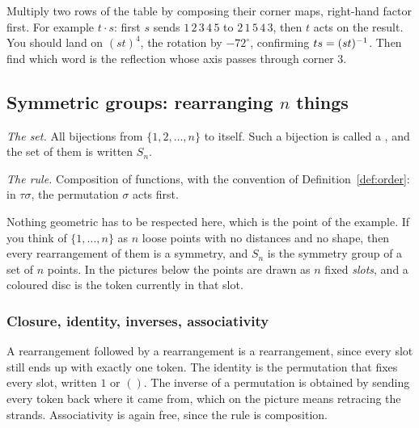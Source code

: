 

\begin{tryit}
Multiply two rows of the table by composing their corner maps, right-hand factor first. For example
$t\cdot s$: first $s$ sends $1\,2\,3\,4\,5$ to $2\,1\,5\,4\,3$, then $t$ acts on the result. You
should land on $(st)^4$, the rotation by $-72^\circ$, confirming $ts=(st)^{-1}$. Then find which word
is the reflection whose axis passes through corner $3$.
\end{tryit}

\subsection{Symmetric groups: rearranging $n$ things}\label{sec:symmetric}

\emph{The set.} All bijections from $\{1,2,\dots,n\}$ to itself. Such a bijection is called a
, and the set of them is written $S_n$.

\emph{The rule.} Composition of functions, with the convention of Definition~\ref{def:order}: in
$\tau\sigma$, the permutation $\sigma$ acts first.

Nothing geometric has to be respected here, which is the point of the example. If you think of
$\{1,\dots,n\}$ as $n$ loose points with no distances and no shape, then every rearrangement of them
is a symmetry, and $S_n$ is the symmetry group of a set of $n$ points. In the pictures below the
points are drawn as $n$ fixed \emph{slots}, and a coloured disc is the token currently in that slot.

\subsubsection*{Closure, identity, inverses, associativity}

A rearrangement followed by a rearrangement is a rearrangement, since every slot still ends up with
exactly one token. The identity is the permutation that fixes every slot, written $1$ or $()$. The
inverse of a permutation is obtained by sending every token back where it came from, which on the
picture means retracing the strands. Associativity is again free, since the rule is composition.

